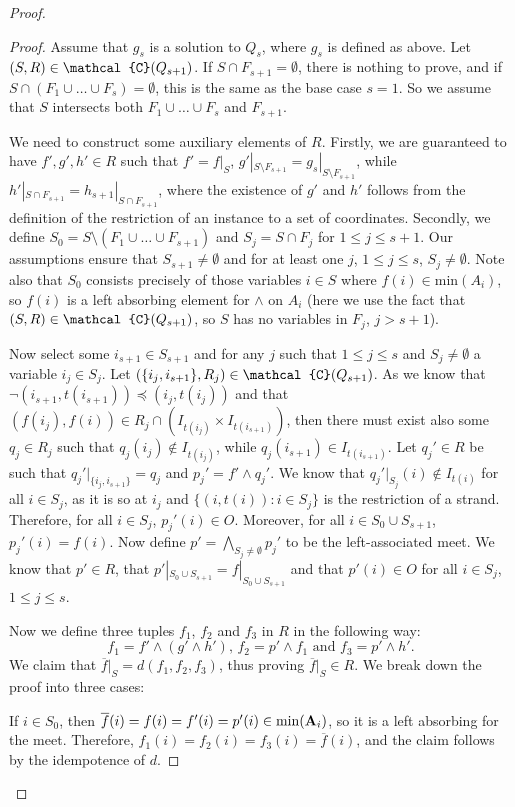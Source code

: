 \documentclass[11pt]{amsart}
\newcommand{\m}[1]{{\uppercase {\mathbf {#1}}}}
\newcommand{\vr}[1]{{\uppercase {\mathcal{#1}}}}
\newcommand{\mt}{\wedge}
\theoremstyle{definition}
\begin{document}
\begin{proof}
\begin{proof}
Assume that $g_s$ is a solution to $Q_s$, where $g_s$ is
defined as above. Let $(S,R)\in \vr c(Q_{s+1})$. If $S\cap F_{s+1}=\emptyset$, there is nothing to prove, and if $S\cap (F_1\cup\ldots\cup F_s)=\emptyset$, this is the same as the base case $s=1$. So we assume that $S$ intersects both $F_1\cup\ldots\cup F_s$ and $F_{s+1}$.

We need to construct some auxiliary elements of $R$. Firstly, we are guaranteed to have $f',g',h'\in R$ such that $f'=f|_S$, $g'|_{S\setminus F_{s+1}}=g_s|_{S\setminus F_{s+1}}$, while $h'|_{S\cap F_{s+1}}=h_{s+1}|_{S\cap F_{s+1}}$, where the existence of $g'$ and $h'$ follows from the definition of the restriction of an instance to a set of coordinates. Secondly, we define $S_0=S\setminus(F_1\cup\ldots\cup F_{s+1})$ and $S_j=S\cap F_j$ for $1\leq j\leq s+1$. Our assumptions ensure that $S_{s+1}\neq\emptyset$ and for at least one $j$, $1\leq j\leq s$, $S_j\neq\emptyset$. Note also that $S_0$ consists precisely of those variables $i\in S$ where $f(i)\in\mathrm{min}(A_i)$, so $f(i)$ is a left absorbing element for $\mt$ on $A_i$ (here we use the fact that $(S,R)\in \vr c(Q_{s+1})$, so $S$ has no variables in $F_j$, $j>s+1$).

Now select some $i_{s+1}\in S_{s+1}$ and for any $j$ such that $1\leq j\leq s$ and $S_j\neq \emptyset$ a variable $i_j\in S_j$. Let $(\{i_j,i_{s+1}\},R_j)\in \vr c(Q_{s+1})$. As we know that $\neg(i_{s+1},t(i_{s+1}))\preceq(i_j,t(i_j))$ and that $(f(i_j),f(i))\in R_j\cap (I_{t(i_j)}\times I_{t(i_{s+1})})$, then there must exist also some $q_j\in R_j$ such that $q_j(i_j)\notin I_{t(i_j)}$, while $q_j(i_{s+1})\in I_{t(i_{s+1})}$. Let $q_j'\in R$ be such that $q_j'|_{\{i_j,i_{s+1}\}}=q_j$ and $p_j'=f'\mt q_j'$. We know that $q_j'|_{S_j}(i)\notin I_{t(i)}$ for all $i\in S_j$, as it is so at $i_j$ and $\{(i,t(i)):i\in S_j\}$ is the restriction of a strand. Therefore, for all $i\in S_j$, $p_j'(i)\in O$. Moreover, for all $i\in S_0\cup S_{s+1}$, $p_j'(i)=f(i)$. Now define $p'=\bigwedge\limits_{S_j\neq \emptyset}p_j'$ to be the left-associated meet. We know that $p'\in R$, that $p'|_{S_0\cup S_{s+1}}=f|_{S_0\cup S_{s+1}}$ and that $p'(i)\in O$ for all $i\in S_j$, $1\leq j\leq s$.

Now we define three tuples $f_1$, $f_2$ and $f_3$ in $R$ in the following way: $$f_1=f'\mt (g'\mt h')\text{, }f_2=p'\mt f_1\text{ and }f_3=p'\mt h'.$$ We claim that $\overline{f}|_S=d(f_1,f_2,f_3)$, thus proving $\overline{f}|_S\in R$. We break down the proof into three cases: 

If $i\in S_0$, then $\overline{f}(i)=f(i)=f'(i)=p'(i)\in\mathrm{min}(\m A_i)$, so it is a left absorbing for the meet. Therefore, $f_1(i)=f_2(i)=f_3(i)=\overline{f}(i)$, and the claim follows by the idempotence of $d$.


\end{proof}
\end{proof}
\end{document}
